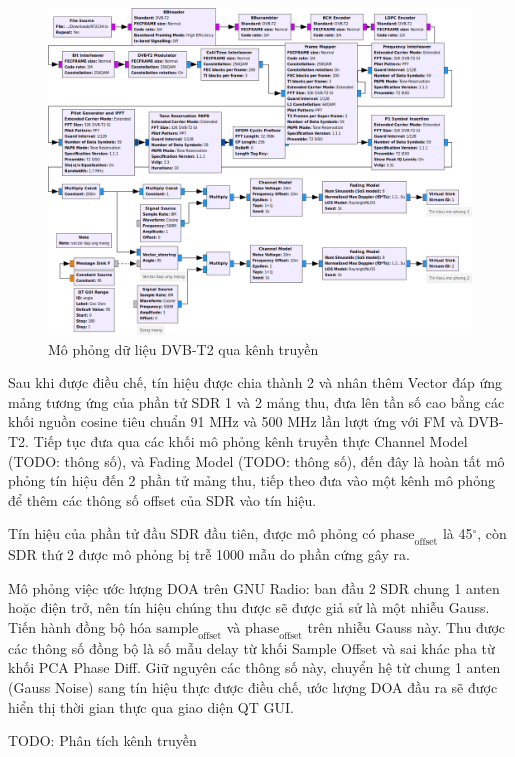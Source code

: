 {\begin{figure} [!h]
	\centering
	\includegraphics[width=1\linewidth]{figures/dvbt2mod.png}
	\caption{Mô phỏng dữ liệu DVB-T2 qua kênh truyền}
	\label{fig:dvbt2mod}
\end{figure}

Sau khi được điều chế, tín hiệu được chia thành 2 và nhân thêm Vector đáp ứng mảng tương ứng của phần tử SDR 1 và 2 mảng thu, đưa lên tần số cao bằng các khối nguồn cosine tiêu chuẩn 91 MHz và 500 MHz lần lượt ứng với FM và DVB-T2. Tiếp tục đưa qua các khối mô phỏng kênh truyền thực Channel Model (TODO: thông số), và Fading Model (TODO: thông số), đến đây là hoàn tất mô phỏng tín hiệu đến 2 phần tử mảng thu, tiếp theo đưa vào một kênh mô phỏng để thêm các thông số offset của SDR vào tín hiệu.

Tín hiệu của phần tử đầu SDR đầu tiên, được mô phỏng có $\textrm{phase}_\textrm{offset}$ là 45$^{\circ}$, còn SDR thứ 2 được mô phỏng bị trễ 1000 mẫu do phần cứng gây ra.

Mô phỏng việc ước lượng DOA trên GNU Radio: ban đầu 2 SDR chung 1 anten hoặc điện trở, nên tín hiệu chúng thu được sẽ được giả sử là một nhiễu Gauss. Tiến hành đồng bộ hóa $\textrm{sample}_\textrm{offset}$ và $\textrm{phase}_\textrm{offset}$ trên nhiễu Gauss này. Thu được các thông số đồng bộ là số mẫu delay từ khối Sample Offset và sai khác pha từ khối PCA Phase Diff. Giữ nguyên các thông số này, chuyển hệ từ chung 1 anten (Gauss Noise) sang tín hiệu thực được điều chế, ước lượng DOA đầu ra sẽ được hiển thị thời gian thực qua giao diện QT GUI.

TODO: Phân tích kênh truyền

}
